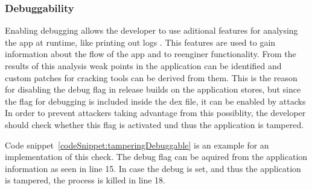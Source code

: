 \subsubsection{Debuggability} \label{subsection:section:counter-improve-tampering-debuggable}
Enabling debugging allows the developer to use aditional features for analysing the app at runtime, like printing out logs \cite{androidDebugging}.
This features are used to gain information about the flow of the app and to reenginer functionality.
From the results of this analysis weak points in the application can be identified and custom patches for cracking tools can be derived from them.
This is the reason for disabling the debug flag in release builds on the application stores, but since the flag for debugging is included inside the \gls{dex} file, it can be enabled by attacks
In order to prevent attackers taking advantage from this possiblity, the developer should check whether this flag is activated und thus the application is tampered.
\newline

Code snippet~\ref{codeSnippet:tamperingDebuggable} is an example for an implementation of this check.
The debug flag can be aquired from the application information as seen in line 15.
In case the debug is set, and thus the application is tampered, the process is killed in line 18.
